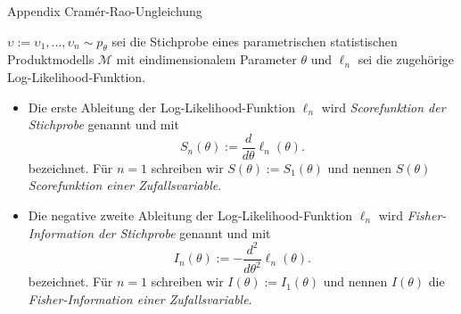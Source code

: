 \documentclass[
  8pt,
  ignorenonframetext,
]{beamer}
\newcommand{\ups} {\upsilon}
\begin{document}
\begin{frame}{Appendix \textbar{} Cramér-Rao-Ungleichung}
\protect\hypertarget{appendix-cramuxe9r-rao-ungleichung-1}{}
\small
\begin{definition}
\justifying
$\ups := \ups_1,...,\ups_n \sim p_\theta$ sei die Stichprobe eines parametrischen
statistischen Produktmodells $\mathcal{M}$ mit eindimensionalem Parameter
$\theta$ und $\ell_n$ sei die zugehörige Log-Likelihood-Funktion.
\begin{itemize}
\justifying
\item Die erste Ableitung der Log-Likelihood-Funktion $\ell_n$ wird
\textit{Scorefunktion der  Stichprobe} genannt und mit
\begin{equation}
S_n(\theta) := \frac{d}{d\theta}\ell_n(\theta).
\end{equation}
bezeichnet. Für $n = 1$ schreiben wir $S(\theta) := S_1(\theta)$ und nennen
$S(\theta)$  \textit{Scorefunktion einer Zufallsvariable}.
\item Die negative zweite Ableitung der Log-Likelihood-Funktion $\ell_n$ wird
\textit{Fisher-Information der Stichprobe} genannt und mit
\begin{equation}
I_n(\theta) := -\frac{d^2}{d\theta^2}\ell_n(\theta).
\end{equation}
bezeichnet. Für $n  = 1$ schreiben wir $I(\theta) := I_1(\theta)$ und
nennen $I(\theta)$ die \textit{Fisher-Information einer Zufallsvariable}.
\end{itemize}
\end{definition}
\end{frame}
\end{document}
